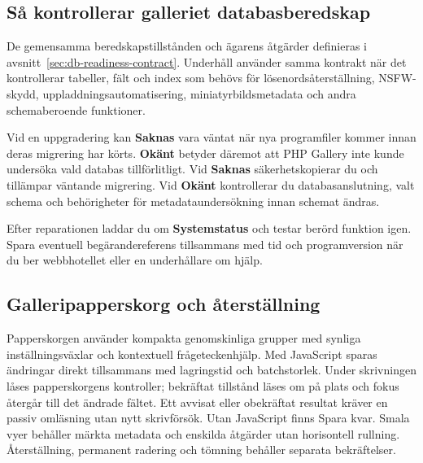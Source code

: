 \documentclass[11pt,a4paper]{article}
\newcommand{\ui}[1]{\textbf{#1}}
\begin{document}
\subsection{Så kontrollerar galleriet databasberedskap}

De gemensamma beredskapstillstånden och ägarens åtgärder definieras i
avsnitt~\ref{sec:db-readiness-contract}. Underhåll använder samma kontrakt när
det kontrollerar tabeller, fält och index som behövs för lösenordsåterställning,
NSFW-skydd, uppladdningsautomatisering, miniatyrbildsmetadata och andra
schemaberoende funktioner.

Vid en uppgradering kan \ui{Saknas} vara väntat när nya programfiler kommer
innan deras migrering har körts. \ui{Okänt} betyder däremot att PHP Gallery inte
kunde undersöka vald databas tillförlitligt. Vid \ui{Saknas} säkerhetskopierar
du och tillämpar väntande migrering. Vid \ui{Okänt} kontrollerar du
databasanslutning, valt schema och behörigheter för metadataundersökning innan
schemat ändras.

Efter reparationen laddar du om \ui{Systemstatus} och testar berörd funktion
igen. Spara eventuell begärandereferens tillsammans med tid och programversion
när du ber webbhotellet eller en underhållare om hjälp.

\subsection{Galleripapperskorg och återställning}

Papperskorgen använder kompakta genomskinliga grupper med synliga
inställningsväxlar och kontextuell frågeteckenhjälp. Med JavaScript sparas
ändringar direkt tillsammans med lagringstid och batchstorlek. Under skrivningen
låses papperskorgens kontroller; bekräftat tillstånd läses om på plats och fokus
återgår till det ändrade fältet. Ett avvisat eller obekräftat resultat kräver en
passiv omläsning utan nytt skrivförsök. Utan JavaScript finns Spara kvar. Smala
vyer behåller märkta metadata och enskilda åtgärder utan horisontell rullning.
Återställning, permanent radering och tömning behåller separata bekräftelser.
\end{document}
